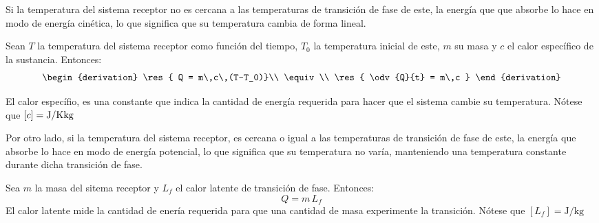 Si la temperatura del sistema receptor no es cercana a las temperaturas
de transición de fase de este, la energía que que absorbe lo hace en
modo de energía cinética, lo que significa que su temperatura cambia de
forma lineal.

Sean $T$ la temperatura del sistema receptor como función del tiempo,
$T_0$ la temperatura inicial de este, $m$ su masa y $c$ el calor
específico de la sustancia. Entonces:
\[
    \begin{derivation}
            \res{ Q = m\,c\,(T-T_0)}\\
        \equiv\\
            \res{ \odv{Q}{t} = m\,c }
    \end{derivation}
\]

El calor específio, es una constante que indica la cantidad de energía
requerida para hacer que el sistema cambie su temperatura.
Nótese que $[c] = \si{\joule\per{\kelvin\kg}}$

Por otro lado, si la temperatura del sistema receptor, es cercana o
igual a las temperaturas de transición de fase de este, la energía que
absorbe lo hace en modo de energía potencial, lo que significa que su
temperatura no varía, manteniendo una temperatura constante durante
dicha transición de fase.

Sea $m$ la masa del sitema receptor y $L_f$ el calor latente de
transición de fase. Entonces:
\[Q = m\,L_f\]
El calor latente mide la cantidad de enería requerida para que una
cantidad de masa experimente la transición.
Nótese que $[L_f] = \si{\joule\per\kg}$